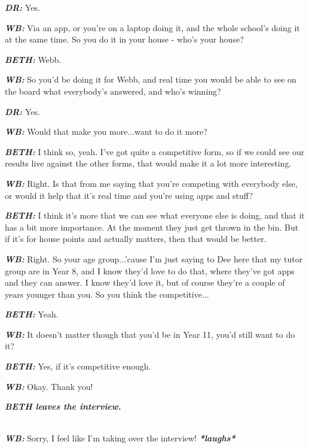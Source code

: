 \textit{\textbf{DR:}} Yes.

\textit{\textbf{WB:}} Via an app, or you're on a laptop doing it, and the whole school's doing it at the same time. So you do it in your house - who's your house?

\textit{\textbf{BETH:}} Webb.

\textit{\textbf{WB:}} So you'd be doing it for Webb, and real time you would be able to see on the board what everybody's answered, and who's winning?

\textit{\textbf{DR:}} Yes.

\textit{\textbf{WB:}} Would that make you more...want to do it more?

\textit{\textbf{BETH:}} I think so, yeah. I've got quite a competitive form, so if we could see our results live against the other forms, that would make it a lot more interesting.

\textit{\textbf{WB:}} Right. Is that from me saying that you're competing with everybody else, or would it help that it's real time and you're using apps and stuff?

\textit{\textbf{BETH:}} I think it's more that we can see what everyone else is doing, and that it has a bit more importance. At the moment they just get thrown in the bin. But if it's for house points and actually matters, then that would be better.

\textit{\textbf{WB:}} Right. So your age group...'cause I'm just saying to Dee here that my tutor group are in Year 8, and I know they'd love to do that, where they've got apps and they can answer. I know they'd love it, but of course they're a couple of years younger than you. So you think the competitive...

\textit{\textbf{BETH:}} Yeah.

\textit{\textbf{WB:}} It doesn't matter though that you'd be in Year 11, you'd still want to do it?

\textit{\textbf{BETH:}} Yes, if it's competitive enough.

\textit{\textbf{WB:}} Okay. Thank you!\\

\begin{center}
\textit{\textbf{BETH leaves the interview.\\}}
\end{center}

\textit{\textbf{\\WB:}} Sorry, I feel like I'm taking over the interview! \textit{\textbf{*laughs*}}

